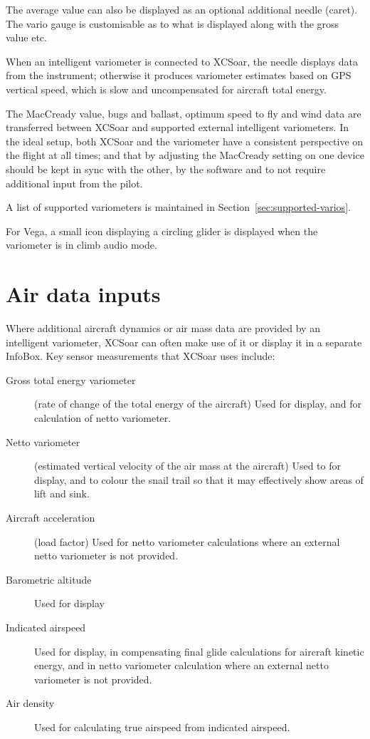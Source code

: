 \documentclass[a4paper,12pt]{refrep}
\begin{document}
The average value can also be displayed as an optional additional
needle (caret).
The vario gauge is customisable  as to what is displayed
along with the gross value etc.

When an intelligent variometer is connected to XCSoar, the needle
displays data from the instrument; otherwise it produces variometer
estimates based on GPS vertical speed, which is slow and uncompensated
for aircraft total energy.  

The MacCready value, bugs and ballast, optimum speed to fly and wind
data are transferred between XCSoar and supported external intelligent
variometers.  In the ideal setup, both XCSoar and the variometer have
a consistent perspective on the flight at all times; and that by
adjusting the MacCready setting on one device should be kept in sync
with the other, by the software and to not require additional input from
the pilot.

A list of supported variometers is maintained in
Section~\ref{sec:supported-varios}.

For Vega, a small icon displaying a circling glider is displayed when
the variometer is in climb audio mode.

\section{Air data inputs}

Where additional aircraft dynamics or air mass data are provided by an
intelligent variometer, XCSoar can often make use of it or display it
in a separate InfoBox.  Key sensor measurements that XCSoar uses include:
\begin{description}
\item[Gross total energy variometer] (rate of change of the total energy of
 the aircraft)  Used for display, and for calculation of netto variometer.
\item[Netto variometer] (estimated vertical velocity of the air mass at
 the aircraft)  Used to for display, and to colour the snail trail
 so that it may effectively show areas of lift and sink.
\item[Aircraft acceleration] (load factor)  Used for netto variometer
  calculations where an external netto variometer is not provided.
\item[Barometric altitude] Used for display
\item[Indicated airspeed] Used for display, in compensating final glide
  calculations for aircraft kinetic energy, and in netto variometer
  calculation where an external netto variometer is not provided.
\item[Air density] Used for calculating true airspeed from indicated
  airspeed.
\end{description}
\end{document}
